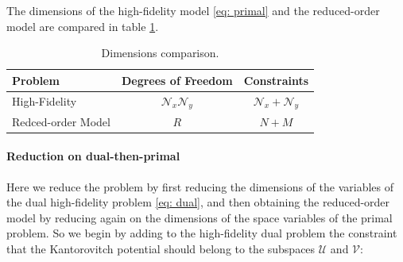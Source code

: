 \documentclass{article}
\def\cN{\mathcal{N}}
\def\cU{\mathcal{U}}
\def\cV{\mathcal{V}}
\begin{document}
%
The dimensions of the high-fidelity model \eqref{eq: primal} and the reduced-order model are compared in table \ref{tab: dimensions}.
%
\begin{table}[htbp]
\centering
\begin{tabular}{l c c}
\toprule
Problem & Degrees of Freedom & Constraints \\
\midrule
High-Fidelity & $\cN_x \cN_y$ & $\cN_x + \cN_y$ \\
Redced-order Model & $R$ & $N+M$ \\
\bottomrule
\end{tabular}
\caption{Dimensions comparison.}\label{tab: dimensions}
\end{table}
%
%
\paragraph{Reduction on dual-then-primal}
%
Here we reduce the problem by first reducing the dimensions of the variables of the dual high-fidelity problem \eqref{eq: dual}, and then obtaining the reduced-order model by reducing again on the dimensions of the space variables of the primal problem. So we begin by adding to the high-fidelity dual problem the constraint that the Kantorovitch potential should belong to the subspaces $\cU$ and $\cV$:
\end{document}
